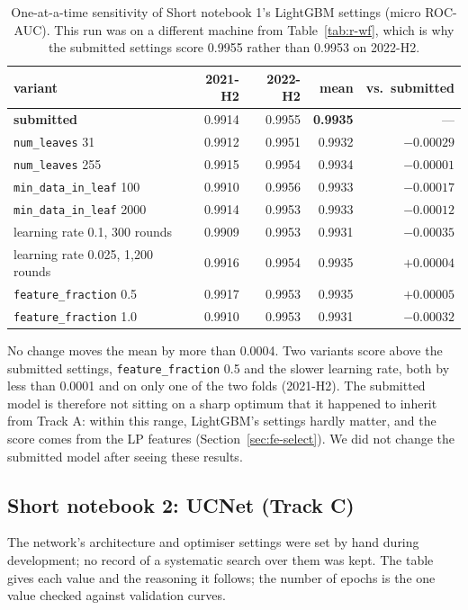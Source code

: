 \documentclass[11pt]{article}
\begin{document}
\begin{table}[H]
\centering\small
\begin{tabular}{lrrrr}
\toprule
variant & 2021-H2 & 2022-H2 & mean & vs.\ submitted \\
\midrule
\textbf{submitted} & 0.9914 & 0.9955 & \textbf{0.9935} & --- \\
\texttt{num\_leaves} 31 & 0.9912 & 0.9951 & 0.9932 & $-0.00029$ \\
\texttt{num\_leaves} 255 & 0.9915 & 0.9954 & 0.9934 & $-0.00001$ \\
\texttt{min\_data\_in\_leaf} 100 & 0.9910 & 0.9956 & 0.9933 & $-0.00017$ \\
\texttt{min\_data\_in\_leaf} 2000 & 0.9914 & 0.9953 & 0.9933 & $-0.00012$ \\
learning rate 0.1, 300 rounds & 0.9909 & 0.9953 & 0.9931 & $-0.00035$ \\
learning rate 0.025, 1{,}200 rounds & 0.9916 & 0.9954 & 0.9935 & $+0.00004$ \\
\texttt{feature\_fraction} 0.5 & 0.9917 & 0.9953 & 0.9935 & $+0.00005$ \\
\texttt{feature\_fraction} 1.0 & 0.9910 & 0.9953 & 0.9931 & $-0.00032$ \\
\bottomrule
\end{tabular}
\caption{One-at-a-time sensitivity of Short notebook 1's LightGBM settings (micro ROC-AUC). This run
was on a different machine from Table~\ref{tab:r-wf}, which is why the submitted settings score
0.9955 rather than 0.9953 on 2022-H2.}
\label{tab:r-lgbm-sens}
\end{table}

No change moves the mean by more than 0.0004. Two variants score above the submitted settings,
\texttt{feature\_fraction} 0.5 and the slower learning rate, both by less than 0.0001 and on only one
of the two folds (2021-H2). The submitted model is therefore not sitting on a sharp optimum that it happened to
inherit from Track A: within this range, LightGBM's settings hardly matter, and the score comes from
the LP features (Section~\ref{sec:fe-select}). We did not change the submitted model after seeing these
results.

\subsection{Short notebook 2: UCNet (Track C)}

The network's architecture and optimiser settings were set by hand during development; no record of a
systematic search over them was kept. The table gives each value and the reasoning it follows; the
number of epochs is the one value checked against validation curves.
\end{document}
